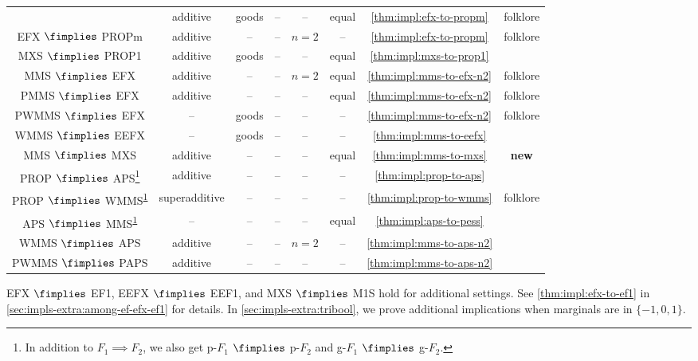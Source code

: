 \begin{longtable}{cccccccc}
    & additive & goods & -- & -- & equal & \cref{thm:impl:efx-to-propm} & folklore
\\[\defaultaddspace] EFX $\fimplies$ PROPm
    & additive & -- & -- & $n=2$ & -- & \cref{thm:impl:efx-to-propm} & folklore
\\[\defaultaddspace] MXS $\fimplies$ PROP1
    & additive & goods & -- & -- & equal & \cref{thm:impl:mxs-to-prop1} & \cite{caragiannis2023new}
%
\\\midrule MMS $\fimplies$ EFX
    & additive & -- & -- & $n=2$ & equal & \cref{thm:impl:mms-to-efx-n2} & folklore
\\[\defaultaddspace] PMMS $\fimplies$ EFX
    & additive & -- & -- & -- & equal & \cref{thm:impl:mms-to-efx-n2} & folklore
\\[\defaultaddspace] PWMMS $\fimplies$ EFX
    & -- & goods & -- & -- & -- & \cref{thm:impl:mms-to-efx-n2} & folklore
\\[\defaultaddspace] WMMS $\fimplies$ EEFX
    & -- & goods & -- & -- & -- & \cref{thm:impl:mms-to-eefx} & \cite{caragiannis2023new}
\\[\defaultaddspace] MMS $\fimplies$ MXS
    & additive & -- & -- & -- & equal & \cref{thm:impl:mms-to-mxs} & \textbf{new}
%
\\\midrule PROP $\fimplies$ APS\footnote{\label{foot:pg}In addition to $F_1 \implies F_2$,
    we also get p-$F_1$ $\fimplies$ p-$F_2$ and g-$F_1$ $\fimplies$ g-$F_2$.}
    & additive & -- & -- & -- & -- & \cref{thm:impl:prop-to-aps} & \cite{babaioff2023fair}
\\[\defaultaddspace] PROP $\fimplies$ WMMS\textsuperscript{\ref{foot:pg}}
    & superadditive & -- & -- & -- & -- & \cref{thm:impl:prop-to-wmms} & folklore
\\[\defaultaddspace] APS $\fimplies$ MMS\textsuperscript{\ref{foot:pg}}
    & -- & -- & -- & -- & equal & \cref{thm:impl:aps-to-pess} & \cite{babaioff2023fair}
\\[\defaultaddspace] WMMS $\fimplies$ APS
    & additive & -- & -- & $n=2$ & -- & \cref{thm:impl:mms-to-aps-n2} & \cite{babaioff2023fair}
\\[\defaultaddspace] PWMMS $\fimplies$ PAPS
    & additive & -- & -- & -- & -- & \cref{thm:impl:mms-to-aps-n2} & \cite{babaioff2023fair}
\\ \bottomrule
\end{longtable}
\normalsize

EFX $\fimplies$ EF1, EEFX $\fimplies$ EEF1, and MXS $\fimplies$ M1S hold for additional settings.
See \cref{thm:impl:efx-to-ef1} in \cref{sec:impls-extra:among-ef-efx-ef1} for details.
In \cref{sec:impls-extra:tribool}, we prove additional implications when marginals are in $\{-1, 0, 1\}$.
